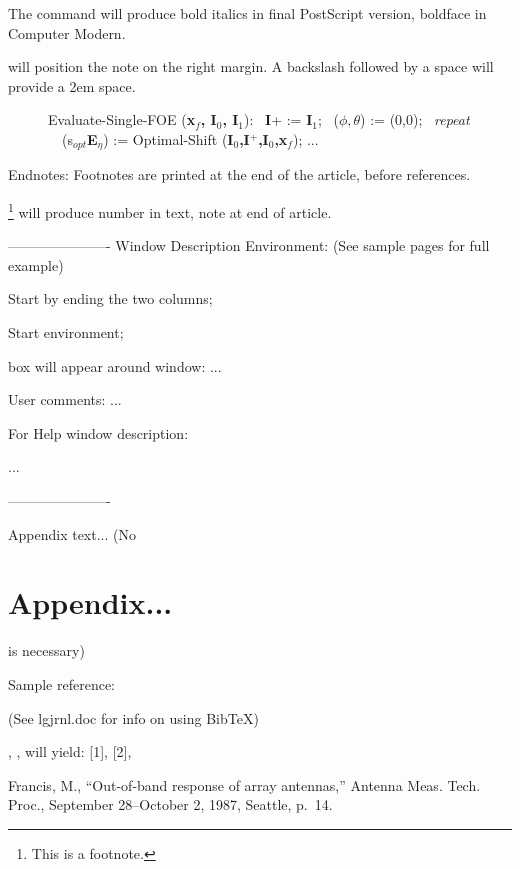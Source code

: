 \begin{itemize}
\begin{codebox}{2.5in}
{The command
\bit will produce bold italics in final PostScript version,
boldface in Computer Modern. 

\note{} will position the note on the right margin. 
A backslash followed by a space will provide a 2em space.

\spanbothcolumns
\begin{figure}[t]
\begin{algorithm}
{\bit Evaluate-Single-FOE} ({\bf x$_f$, I$_0$, I$_1$}):
\ {\bf I}+ := {\bf I}$_1$;
\ ($\phi,\theta$) := (0,0);
\ {\it repeat}
\ \ (s$_{opt}${\bf E}$_\eta$) := {\bit Optimal-Shift}%
({\bf I$_0$,I$^+$,I$_0$,x$_f$});
...
\end{algorithm}
\caption{ }
\end{figure}
\endspanbothcolumns

Endnotes:
Footnotes are printed at the end of the article, before references.

\footnote{This is a footnote.} will produce number in text, note
at end of article.

----------------------
Window Description Environment:
(See sample pages for full example)

Start by ending the two columns;
\endtwocolumns

Start environment;
\begin{interface}


box will appear around window:
\window
...
\endwindow

User comments: ...

For Help window description:
\window

\endwindow
...
\end{interface}

\twocolumns
----------------------

\appendix
Appendix text...
(No \chapter{Appendix...} is necessary)


Sample reference:

(See lgjrnl.doc for info on using BibTeX)

\cite{francis}, \cite{jacobs}, will yield: [1], [2],

\begin{references}
Francis, M., ``Out-of-band response of array antennas,''
Antenna Meas. Tech. Proc., September 28--October 2, 1987, Seattle, p.~14.


\end{references}}
\end{codebox}
\end{itemize}
